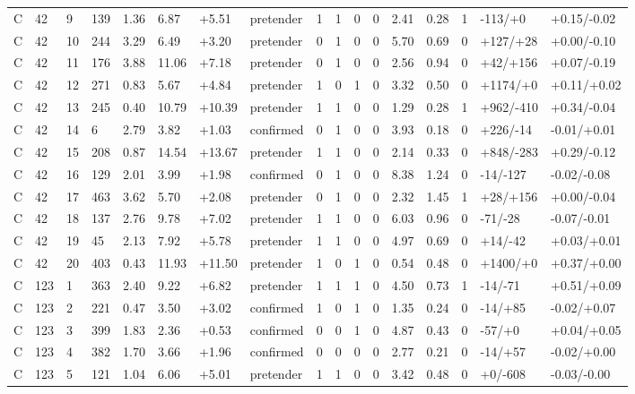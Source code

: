 \documentclass[11pt,a4paper]{article}
\begin{document}
{\begin{longtable}[]{@{}lllllllllllllllll@{}}
C & 42 & 9 & 139 & 1.36 & 6.87 & +5.51 & pretender & 1 & 1 & 0 & 0 & 2.41 & 0.28 & 1 & -113/+0 & +0.15/-0.02 \\
C & 42 & 10 & 244 & 3.29 & 6.49 & +3.20 & pretender & 0 & 1 & 0 & 0 & 5.70 & 0.69 & 0 & +127/+28 & +0.00/-0.10 \\
C & 42 & 11 & 176 & 3.88 & 11.06 & +7.18 & pretender & 0 & 1 & 0 & 0 & 2.56 & 0.94 & 0 & +42/+156 & +0.07/-0.19 \\
C & 42 & 12 & 271 & 0.83 & 5.67 & +4.84 & pretender & 1 & 0 & 1 & 0 & 3.32 & 0.50 & 0 & +1174/+0 & +0.11/+0.02 \\
C & 42 & 13 & 245 & 0.40 & 10.79 & +10.39 & pretender & 1 & 1 & 0 & 0 & 1.29 & 0.28 & 1 & +962/-410 & +0.34/-0.04 \\
C & 42 & 14 & 6 & 2.79 & 3.82 & +1.03 & confirmed & 0 & 1 & 0 & 0 & 3.93 & 0.18 & 0 & +226/-14 & -0.01/+0.01 \\
C & 42 & 15 & 208 & 0.87 & 14.54 & +13.67 & pretender & 1 & 1 & 0 & 0 & 2.14 & 0.33 & 0 & +848/-283 & +0.29/-0.12 \\
C & 42 & 16 & 129 & 2.01 & 3.99 & +1.98 & confirmed & 0 & 1 & 0 & 0 & 8.38 & 1.24 & 0 & -14/-127 & -0.02/-0.08 \\
C & 42 & 17 & 463 & 3.62 & 5.70 & +2.08 & pretender & 0 & 1 & 0 & 0 & 2.32 & 1.45 & 1 & +28/+156 & +0.00/-0.04 \\
C & 42 & 18 & 137 & 2.76 & 9.78 & +7.02 & pretender & 1 & 1 & 0 & 0 & 6.03 & 0.96 & 0 & -71/-28 & -0.07/-0.01 \\
C & 42 & 19 & 45 & 2.13 & 7.92 & +5.78 & pretender & 1 & 1 & 0 & 0 & 4.97 & 0.69 & 0 & +14/-42 & +0.03/+0.01 \\
C & 42 & 20 & 403 & 0.43 & 11.93 & +11.50 & pretender & 1 & 0 & 1 & 0 & 0.54 & 0.48 & 0 & +1400/+0 & +0.37/+0.00 \\
C & 123 & 1 & 363 & 2.40 & 9.22 & +6.82 & pretender & 1 & 1 & 1 & 0 & 4.50 & 0.73 & 1 & -14/-71 & +0.51/+0.09 \\
C & 123 & 2 & 221 & 0.47 & 3.50 & +3.02 & confirmed & 1 & 0 & 1 & 0 & 1.35 & 0.24 & 0 & -14/+85 & -0.02/+0.07 \\
C & 123 & 3 & 399 & 1.83 & 2.36 & +0.53 & confirmed & 0 & 0 & 1 & 0 & 4.87 & 0.43 & 0 & -57/+0 & +0.04/+0.05 \\
C & 123 & 4 & 382 & 1.70 & 3.66 & +1.96 & confirmed & 0 & 0 & 0 & 0 & 2.77 & 0.21 & 0 & -14/+57 & -0.02/+0.00 \\
C & 123 & 5 & 121 & 1.04 & 6.06 & +5.01 & pretender & 1 & 1 & 0 & 0 & 3.42 & 0.48 & 0 & +0/-608 & -0.03/-0.00 \\

\end{longtable}}
\end{document}
